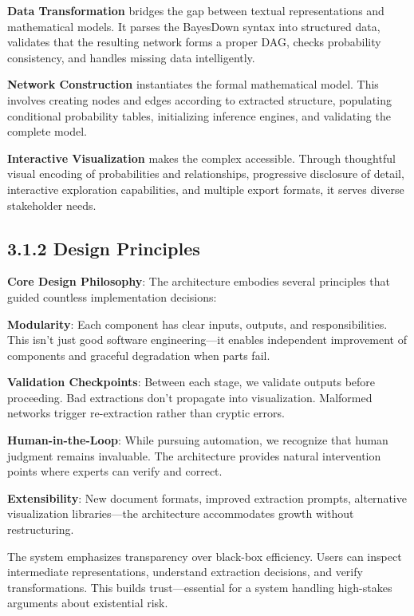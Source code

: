 \documentclass[
  11pt,
  letterpaper,
  openany]{book}
\begin{document}
\textbf{Data Transformation} bridges the gap between textual
representations and mathematical models. It parses the BayesDown syntax
into structured data, validates that the resulting network forms a
proper DAG, checks probability consistency, and handles missing data
intelligently.

\textbf{Network Construction} instantiates the formal mathematical
model. This involves creating nodes and edges according to extracted
structure, populating conditional probability tables, initializing
inference engines, and validating the complete model.

\textbf{Interactive Visualization} makes the complex accessible. Through
thoughtful visual encoding of probabilities and relationships,
progressive disclosure of detail, interactive exploration capabilities,
and multiple export formats, it serves diverse stakeholder needs.

\subsection{3.1.2 Design Principles}\label{sec-design-principles}

\textbf{Core Design Philosophy}: The architecture embodies several
principles that guided countless implementation decisions:

\textbf{Modularity}: Each component has clear inputs, outputs, and
responsibilities. This isn't just good software engineering---it enables
independent improvement of components and graceful degradation when
parts fail.

\textbf{Validation Checkpoints}: Between each stage, we validate outputs
before proceeding. Bad extractions don't propagate into visualization.
Malformed networks trigger re-extraction rather than cryptic errors.

\textbf{Human-in-the-Loop}: While pursuing automation, we recognize that
human judgment remains invaluable. The architecture provides natural
intervention points where experts can verify and correct.

\textbf{Extensibility}: New document formats, improved extraction
prompts, alternative visualization libraries---the architecture
accommodates growth without restructuring.

The system emphasizes transparency over black-box efficiency. Users can
inspect intermediate representations, understand extraction decisions,
and verify transformations. This builds trust---essential for a system
handling high-stakes arguments about existential risk.
\end{document}
